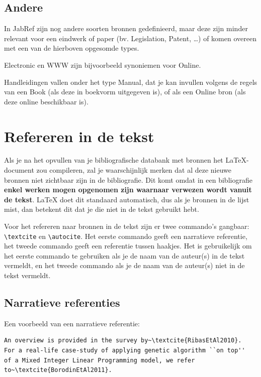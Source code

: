 \subsection{Andere}%
\label{ssec:andere}

In JabRef zijn nog andere soorten bronnen gedefinieerd, maar deze zijn minder relevant voor een eindwerk of paper (bv. Legislation, Patent, \ldots) of komen overeen met een van de hierboven opgesomde types.

Electronic en WWW zijn bijvoorbeeld synoniemen voor Online.

Handleidingen vallen onder het type Manual, dat je kan invullen volgens de regels van een Book (als deze in boekvorm uitgegeven is), of als een Online bron (als deze online beschikbaar is).

\section{Refereren in de tekst}%
\label{sec:bibliografie-refereren}

Als je na het opvullen van je bibliografische databank met bronnen het {\LaTeX}-do\-cu\-ment zou compileren, zal je waarschijnlijk merken dat al deze nieuwe bronnen niet zichtbaar zijn in de bibliografie. Dit komt omdat in een bibliografie \textbf{enkel werken mogen opgenomen zijn waarnaar verwezen wordt vanuit de tekst}. {\LaTeX} doet dit standaard automatisch, dus als je bronnen in de lijst mist, dan betekent dit dat je die niet in de tekst gebruikt hebt.

Voor het refereren naar bronnen in de tekst zijn er twee commando's gangbaar: \texttt{{\textbackslash}textcite} en \texttt{{\textbackslash}autocite}. Het eerste commando geeft een narratieve referentie, het tweede commando geeft een referentie tussen haakjes. Het is gebruikelijk om het eerste commando te gebruiken als je de naam van de auteur(s) in de tekst vermeldt, en het tweede commando als je de naam van de auteur(s) niet in de tekst vermeldt.

\subsection{Narratieve referenties}%
\label{ssec:narratieve_referenties}

Een voorbeeld van een narratieve referentie:

\begin{verbatim}
An overview is provided in the survey by~\textcite{RibasEtAl2010}.
For a real-life case-study of applying genetic algorithm ``on top''
of a Mixed Integer Linear Programming model, we refer
to~\textcite{BorodinEtAl2011}.
\end{verbatim}

